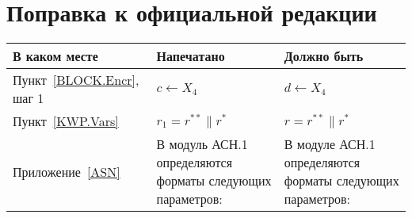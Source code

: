\clearpage
\chapter*{\mbox{}\hfill Поправка к официальной редакции\hfill\mbox{}}

\mbox{}

\begin{center}
\begin{tabular}{|p{3.5cm}|p{6cm}|p{6cm}|}
\hline
В каком месте & Напечатано & Должно быть\\
\hline
\hline
Пункт~\ref{BLOCK.Encr}, шаг 1 &
$c\leftarrow X_4$ &
$d\leftarrow X_4$
\\
\hline
Пункт~\ref{KWP.Vars} &
$r_1=r^{**}\parallel r^*$ &
$r=r^{**}\parallel r^*$\\
\hline
Приложение~\ref{ASN} &
В модуль АСН.1 определяются форматы следующих параметров: &
В модуле АСН.1 определяются форматы следующих параметров:\\
\hline
\end{tabular}
\end{center}